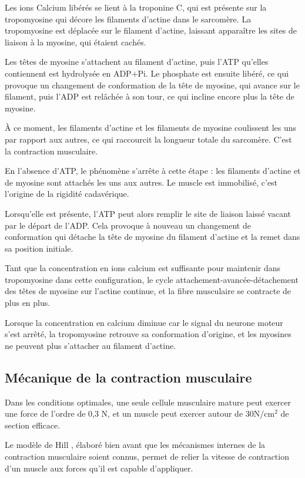 Les ions Calcium libérés se lient à la troponine C, qui est présente sur la tropomyosine qui décore les filaments d'actine dans le sarcomère. La tropomyosine est déplacée sur le filament d'actine, laissant apparaître les sites de liaison à la myosine, qui étaient cachés. 

Les têtes de myosine s'attachent au filament d'actine, puis l'ATP qu'elles contiennent est hydrolysée en ADP+Pi. Le phosphate est ensuite libéré, ce qui provoque un changement de conformation de la tête de myosine, qui avance sur le filament, puis l'ADP est relâchée à son tour, ce qui incline encore plus la tête de myosine. 

À ce moment, les filaments d'actine et les filaments de myosine coulissent les uns par rapport aux autres, ce qui raccourcit la longueur totale du sarcomère. C'est la contraction musculaire. 

En l'absence d'ATP, le phénomène s'arrête à cette étape : les filaments d'actine et de myosine sont attachés les uns aux autres. Le muscle est immobilisé, c'est l'origine de la rigidité cadavérique. 

Lorsqu'elle est présente, l'ATP peut alors remplir le site de liaison laissé vacant par le départ de l'ADP. Cela provoque à nouveau un changement de conformation qui détache la tête de myosine du filament d'actine et la remet dans sa position initiale.

Tant que la concentration en ions calcium est suffisante pour maintenir dans tropomyosine dans cette configuration, le cycle attachement-avancée-détachement des têtes de myosine sur l'actine continue, et la fibre musculaire se contracte de plus en plus. 

Lorsque la concentration en calcium diminue car le signal du neurone moteur s'est arrêté, la tropomyosine retrouve sa conformation d'origine, et les myosines ne peuvent plus s'attacher au filament d'actine. 


\subsection{Mécanique de la contraction musculaire}
Dans les conditions optimales, une seule cellule musculaire mature peut exercer une force de l'ordre de 0,3 \micro N, et un muscle peut exercer autour de 30N/cm$^2$ de section efficace. 

Le modèle de Hill \cite{Hill}, élaboré bien avant que les mécanismes internes de la contraction musculaire soient connus, permet de relier la vitesse de contraction d'un muscle aux forces qu'il est capable d'appliquer. 

